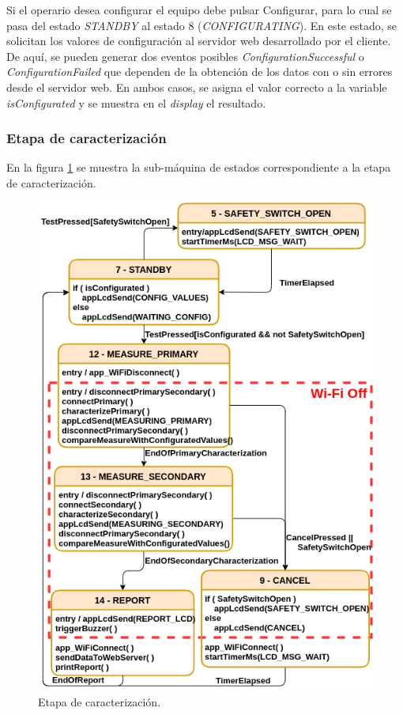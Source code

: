 Si el operario desea configurar el equipo debe pulsar Configurar, para lo cual se pasa del estado \textit{STANDBY} al estado 8 (\textit{CONFIGURATING}). En este estado, se solicitan los valores de configuración al servidor web desarrollado por el cliente. De aquí, se pueden generar dos eventos posibles \textit{ConfigurationSuccessful} o \textit{ConfigurationFailed} que dependen de la obtención de los datos con o sin errores desde el servidor web. En ambos casos, se asigna el valor correcto a la variable \textit{isConfigurated} y se muestra en el \textit{display} el resultado.

\subsubsection{Etapa de caracterización}
\label{subsubsec:EtTest}
En la figura \ref{fig:MainFSM_3} se muestra la sub-máquina de estados correspondiente a la etapa de caracterización. 

\begin{figure}[ht]
	\centering
	\includegraphics[scale=0.95]{./Figures/MainFSM_3.png}
	\caption{Etapa de caracterización.}
	\label{fig:MainFSM_3}
\end{figure}

